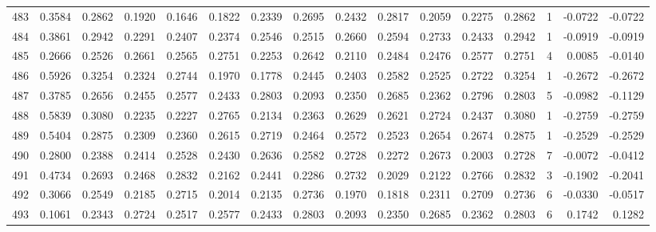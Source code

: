 \begin{tabular}{lrrrrrrrrrrrrrrr}
483 &      0.3584 &  0.2862 &  0.1920 &  0.1646 &  0.1822 &  0.2339 &  0.2695 &  0.2432 &  0.2817 &  0.2059 &   0.2275 &     0.2862 &      1 &                   -0.0722 &                    -0.0722 \\
484 &      0.3861 &  0.2942 &  0.2291 &  0.2407 &  0.2374 &  0.2546 &  0.2515 &  0.2660 &  0.2594 &  0.2733 &   0.2433 &     0.2942 &      1 &                   -0.0919 &                    -0.0919 \\
485 &      0.2666 &  0.2526 &  0.2661 &  0.2565 &  0.2751 &  0.2253 &  0.2642 &  0.2110 &  0.2484 &  0.2476 &   0.2577 &     0.2751 &      4 &                    0.0085 &                    -0.0140 \\
486 &      0.5926 &  0.3254 &  0.2324 &  0.2744 &  0.1970 &  0.1778 &  0.2445 &  0.2403 &  0.2582 &  0.2525 &   0.2722 &     0.3254 &      1 &                   -0.2672 &                    -0.2672 \\
487 &      0.3785 &  0.2656 &  0.2455 &  0.2577 &  0.2433 &  0.2803 &  0.2093 &  0.2350 &  0.2685 &  0.2362 &   0.2796 &     0.2803 &      5 &                   -0.0982 &                    -0.1129 \\
488 &      0.5839 &  0.3080 &  0.2235 &  0.2227 &  0.2765 &  0.2134 &  0.2363 &  0.2629 &  0.2621 &  0.2724 &   0.2437 &     0.3080 &      1 &                   -0.2759 &                    -0.2759 \\
489 &      0.5404 &  0.2875 &  0.2309 &  0.2360 &  0.2615 &  0.2719 &  0.2464 &  0.2572 &  0.2523 &  0.2654 &   0.2674 &     0.2875 &      1 &                   -0.2529 &                    -0.2529 \\
490 &      0.2800 &  0.2388 &  0.2414 &  0.2528 &  0.2430 &  0.2636 &  0.2582 &  0.2728 &  0.2272 &  0.2673 &   0.2003 &     0.2728 &      7 &                   -0.0072 &                    -0.0412 \\
491 &      0.4734 &  0.2693 &  0.2468 &  0.2832 &  0.2162 &  0.2441 &  0.2286 &  0.2732 &  0.2029 &  0.2122 &   0.2766 &     0.2832 &      3 &                   -0.1902 &                    -0.2041 \\
492 &      0.3066 &  0.2549 &  0.2185 &  0.2715 &  0.2014 &  0.2135 &  0.2736 &  0.1970 &  0.1818 &  0.2311 &   0.2709 &     0.2736 &      6 &                   -0.0330 &                    -0.0517 \\
493 &      0.1061 &  0.2343 &  0.2724 &  0.2517 &  0.2577 &  0.2433 &  0.2803 &  0.2093 &  0.2350 &  0.2685 &   0.2362 &     0.2803 &      6 &                    0.1742 &                     0.1282 \\

\end{tabular}
